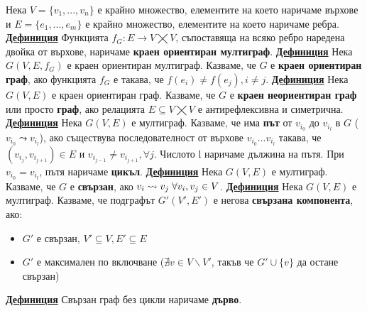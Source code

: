 \documentclass{article}
\begin{document}
Нека $V = \{v_1, ..., v_n\}$ е крайно множество, елементите на което наричаме върхове и $E = \{e_1, ..., e_m\}$
е крайно множество, елементите на което наричаме ребра. \newline\newline
\textbf{\underline{Дефиниция}}
Функцията $f_G : E \rightarrow V \bigtimes V$, съпоставяща на всяко ребро наредена двойка от върхове, наричаме
\textbf{краен ориентиран мултиграф}. \newline\newline
\textbf{\underline{Дефиниция}}
Нека $G(V, E, f_G)$ е краен ориентиран мултиграф. Казваме, че $G$ е \textbf{краен ориентиран граф}, ако функцията $f_G $ е такава, че
$f(e_i) \neq f(e_j), i \neq j$. \newline\newline
\textbf{\underline{Дефиниция}}
Нека $G(V, E)$ е краен ориентиран граф. Казваме, че $G$ е \textbf{краен неориентиран граф} или просто \textbf{граф}, ако релацията
$E \subseteq V \bigtimes V$ е антирефлексивна и симетрична. \newline\newline
\textbf{\underline{Дефиниция}}
Нека $G(V, E)$ е мултиграф. Казваме, че има \textbf{път} от $v_{i_0}$ до $v_{i_l}$ в $G$ ($v_{i_0} \leadsto v_{i_l}$), ако
съществува последователност от върхове $v_{i_0}...v_{i_l}$ такава, че $(v_{i_j}, v_{i_{j + 1}}) \in E$ и $v_{i_{j - 1}} \neq v_{i_{j + 1}}, \forall j$. Числото l наричаме
дължина на пътя. При $v_{i_0} = v_{i_l}$, пътя наричаме \textbf{цикъл}. \newline\newline
\textbf{\underline{Дефиниция}}
Нека $G(V, E)$ е мултиграф. Казваме, че $G$ е \textbf{свързан}, ако $v_i \leadsto v_j \hspace{0.1cm} \forall v_i, v_j \in V$. \newline\newline
\textbf{\underline{Дефиниция}}
Нека $G(V, E)$ е мултиграф. Казваме, че подграфът $G'(V', E')$ е негова \textbf{свързана компонента}, ако:
\begin{itemize}
    \item $G'$ е свързан, $V' \subseteq V, E' \subseteq E$
    \item $G'$ е максимален по включване ($\nexists v \in V \backslash V'$, такъв че $G'\cup \{v\}$ да остане свързан)
\end{itemize}
\textbf{\underline{Дефиниция}}
Свързан граф без цикли наричаме \textbf{дърво}. \newline\newline
\end{document}
